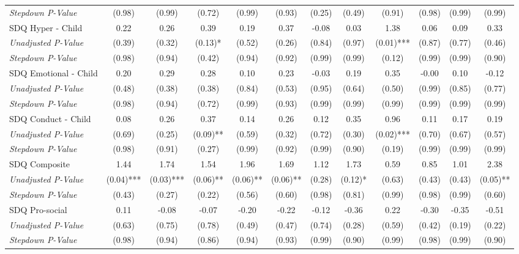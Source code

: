 \begin{tabular}{l c c c c c c c c c c c}
\quad \textit{Stepdown P-Value} & (0.98) & (0.99) & (0.72) & (0.99) & (0.93) & (0.25) & (0.49) & (0.91) & (0.98) & (0.99) & (0.99) \\
SDQ Hyper - Child & 0.22 & 0.26 & 0.39 & 0.19 & 0.37 & -0.08 & 0.03 & 1.38 & 0.06 & 0.09 & 0.33 \\
\quad \textit{Unadjusted P-Value} & (0.39) & (0.32) & (0.13)* & (0.52) & (0.26) & (0.84) & (0.97) & (0.01)*** & (0.87) & (0.77) & (0.46) \\
\quad \textit{Stepdown P-Value} & (0.98) & (0.94) & (0.42) & (0.94) & (0.92) & (0.99) & (0.99) & (0.12) & (0.99) & (0.99) & (0.90) \\
SDQ Emotional - Child & 0.20 & 0.29 & 0.28 & 0.10 & 0.23 & -0.03 & 0.19 & 0.35 & -0.00 & 0.10 & -0.12 \\
\quad \textit{Unadjusted P-Value} & (0.48) & (0.38) & (0.38) & (0.84) & (0.53) & (0.95) & (0.64) & (0.50) & (0.99) & (0.85) & (0.77) \\
\quad \textit{Stepdown P-Value} & (0.98) & (0.94) & (0.72) & (0.99) & (0.93) & (0.99) & (0.99) & (0.99) & (0.99) & (0.99) & (0.99) \\
SDQ Conduct - Child & 0.08 & 0.26 & 0.37 & 0.14 & 0.26 & 0.12 & 0.35 & 0.96 & 0.11 & 0.17 & 0.19 \\
\quad \textit{Unadjusted P-Value} & (0.69) & (0.25) & (0.09)** & (0.59) & (0.32) & (0.72) & (0.30) & (0.02)*** & (0.70) & (0.67) & (0.57) \\
\quad \textit{Stepdown P-Value} & (0.98) & (0.91) & (0.27) & (0.99) & (0.92) & (0.99) & (0.90) & (0.19) & (0.99) & (0.99) & (0.99) \\
SDQ Composite & 1.44 & 1.74 & 1.54 & 1.96 & 1.69 & 1.12 & 1.73 & 0.59 & 0.85 & 1.01 & 2.38 \\
\quad \textit{Unadjusted P-Value} & (0.04)*** & (0.03)*** & (0.06)** & (0.06)** & (0.06)** & (0.28) & (0.12)* & (0.63) & (0.43) & (0.43) & (0.05)** \\
\quad \textit{Stepdown P-Value} & (0.43) & (0.27) & (0.22) & (0.56) & (0.60) & (0.98) & (0.81) & (0.99) & (0.98) & (0.99) & (0.60) \\
SDQ Pro-social & 0.11 & -0.08 & -0.07 & -0.20 & -0.22 & -0.12 & -0.36 & 0.22 & -0.30 & -0.35 & -0.51 \\
\quad \textit{Unadjusted P-Value} & (0.63) & (0.75) & (0.78) & (0.49) & (0.47) & (0.74) & (0.28) & (0.59) & (0.42) & (0.19) & (0.22) \\
\quad \textit{Stepdown P-Value} & (0.98) & (0.94) & (0.86) & (0.94) & (0.93) & (0.99) & (0.90) & (0.99) & (0.98) & (0.99) & (0.90) \\

\end{tabular}
